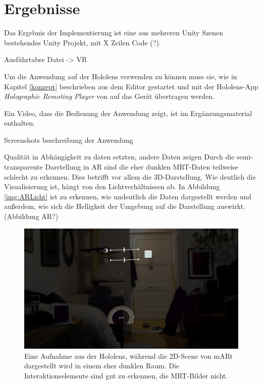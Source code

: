 

\chapter{Ergebnisse}
\label{ergebnisse}

Das Ergebnis der Implementierung ist eine aus mehreren Unity Szenen bestehendes Unity Projekt, mit X Zeilen Code (?). 

Ausführtabre Datei -> VR

Um die Anwendung auf der Hololens verwenden zu können muss sie, wie in Kapitel \ref{konzept} beschrieben aus dem Editor gestartet und mit der Hololens-App \textit{Holographic Remoting Player} von auf das Gerät übertragen werden. 



Ein Video, dass die Bedienung der Anwendung zeigt, ist im Ergänzungsmaterial enthalten.

Screenshots
beschreibung der Anwendung

Qualität in Abhängigkeit zu daten setzten, andere Daten zeigen
Durch die semi-transparente Darstellung in AR sind die eher dunklen MRT-Daten teilweise schlecht zu erkennen. Dies betrifft vor allem die 3D-Darstellung. Wie deutlich die Visualisierung ist, hängt von den Lichtverhältnissen ab. In Abbildung \ref{img:ARLicht} ist zu erkennen, wie undeutlich die Daten dargestellt werden und außerdem, wie sich die Helligkeit der Umgebung auf die Darstellung auswirkt. (Abbildung AR?)


\begin{figure}
	\centering
	\includegraphics[width=0.5\linewidth]{images/hololens2D.jpg}
	\caption{Eine Aufnahme aus der Hololens, während die 2D-Scene von mARt dargestellt wird in einem eher dunklen Raum. Die Interaktionselemente sind gut zu erkennen, die MRT-Bilder nicht.}
	\label{img:mri}
\end{figure}


